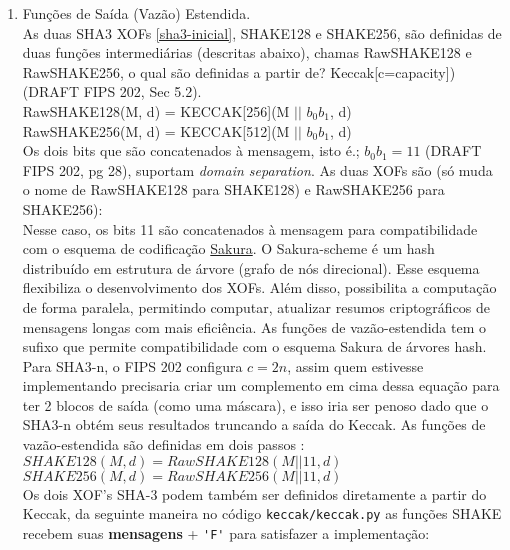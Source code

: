 \documentclass[12pt, a4paper]{article}
\begin{document}
\begin{enumerate}
\begin{enumerate}
\begin{enumerate}
\item Funções de Saída (Vazão) Estendida.\\

As duas SHA3 XOFs \ref{sha3-inicial}, SHAKE128 e SHAKE256, são definidas de duas
funções intermediárias (descritas abaixo), chamas RawSHAKE128 e RawSHAKE256, o
qual são definidas a partir de? Keccak[c=capacity]) (DRAFT FIPS 202, Sec 5.2).\\

RawSHAKE128(M, d) = KECCAK[256](M $||$ $b_{0}b_{1}$, d)\\

RawSHAKE256(M, d) = KECCAK[512](M $||$ $b_{0}b_{1}$, d)\\

Os dois bits que são concatenados à mensagem, isto é.; $b_{0}b_{1}=11$ (DRAFT
FIPS 202, pg 28), suportam \textit{domain separation}. As duas XOFs são (só
muda o nome de RawSHAKE128 para SHAKE128) e RawSHAKE256 para SHAKE256):\\

Nesse caso, os bits 11 são concatenados à mensagem para compatibilidade com o
esquema de codificação \underline{Sakura}. O Sakura-scheme é um hash distribuído
em estrutura de árvore (grafo de nós direcional)\cite{sakura}. Esse esquema
flexibiliza o desenvolvimento dos XOFs. Além disso, possibilita a computação de
forma paralela, permitindo computar, atualizar resumos criptográficos de
mensagens longas com mais eficiência. As funções de vazão-estendida tem o sufixo
que permite compatibilidade com o esquema Sakura de árvores hash. Para SHA3-n, o
FIPS 202 configura $c = 2n$, assim quem estivesse implementando precisaria criar
um complemento em cima dessa equação para ter 2 blocos de saída (como uma
máscara), e isso iria ser penoso dado que o SHA3-n obtém seus resultados
truncando a saída do Keccak. As funções de vazão-estendida são definidas em
dois passos \cite{sakura}:\\

$SHAKE128(M, d) = RawSHAKE128(M || 11, d)$\\

$SHAKE256(M, d) = RawSHAKE256(M || 11, d)$\\

Os dois XOF's SHA-3 podem também ser definidos diretamente a partir do Keccak,
da seguinte maneira no código \verb|keccak/keccak.py| as funções SHAKE recebem
suas \textbf{mensagens} + {\color{Red} \verb|'F'|} para satisfazer a
implementação:\\


\end{enumerate}
\end{enumerate}
\end{enumerate}
\end{document}
